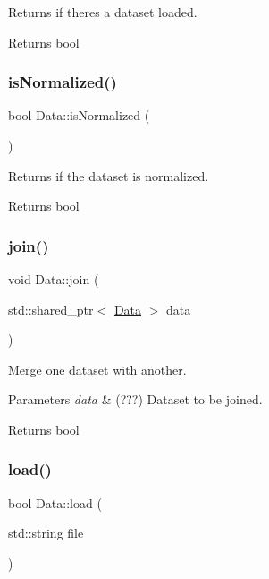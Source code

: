 Returns if there\textquotesingle{}s a dataset loaded. 

\begin{DoxyReturn}{Returns}
bool 
\end{DoxyReturn}
\mbox{\label{class_data_ad96fc8e9c5ec9e40b1dc6d9670eefe0c}} 
\subsubsection{\texorpdfstring{is\+Normalized()}{isNormalized()}}
{\footnotesize\ttfamily bool Data\+::is\+Normalized (\begin{DoxyParamCaption}{ }\end{DoxyParamCaption})\hspace{0.3cm}{\ttfamily [inline]}}



Returns if the dataset is normalized. 

\begin{DoxyReturn}{Returns}
bool 
\end{DoxyReturn}
\mbox{\label{class_data_a89252c083e4dde3ea403e27604db53ea}} 
\subsubsection{\texorpdfstring{join()}{join()}}
{\footnotesize\ttfamily void Data\+::join (\begin{DoxyParamCaption}\item[{std\+::shared\+\_\+ptr$<$ \hyperlink{class_data}{Data} $>$}]{data }\end{DoxyParamCaption})}



Merge one dataset with another. 


\begin{DoxyParams}{Parameters}
{\em data} & (???) Dataset to be joined. \\
\hline
\end{DoxyParams}
\begin{DoxyReturn}{Returns}
bool 
\end{DoxyReturn}
\mbox{\label{class_data_ac2ed251251be234c607f486e16902112}} 
\subsubsection{\texorpdfstring{load()}{load()}}
{\footnotesize\ttfamily bool Data\+::load (\begin{DoxyParamCaption}\item[{std\+::string}]{file }\end{DoxyParamCaption})}



